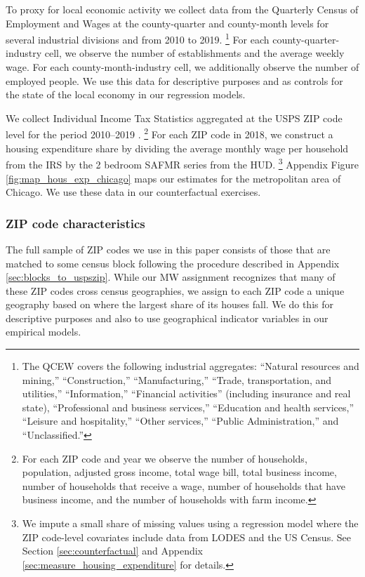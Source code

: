 To proxy for local economic activity we collect data from the 
Quarterly Census of Employment and Wages \parencite[QCEW;][]{QCEW} 
at the county-quarter and county-month levels for several industrial divisions 
and from 2010 to 2019.%
\footnote{The QCEW covers the following industrial aggregates: 
``Natural resources and mining,'' ``Construction,'' ``Manufacturing,'' 
``Trade, transportation, and utilities,'' ``Information,'' 
``Financial activities'' (including insurance and real state), 
``Professional and business services,'' ``Education and health services,'' 
``Leisure and hospitality,'' ``Other services,'' ``Public Administration,''
and ``Unclassified.''}
For each county-quarter-industry cell, we observe the number of establishments 
and the average weekly wage.
For each county-month-industry cell, we additionally observe the number of 
employed people.
We use this data for descriptive purposes and as controls for the state of 
the local economy in our regression models.

We collect Individual Income Tax Statistics aggregated at the USPS ZIP code 
level for the period 2010--2019 \parencite[][IRS for short]{IRS}.%
\footnote{For each ZIP code and year we observe the number of households, 
population, adjusted gross income, total wage bill, total business income, 
number of households that receive a wage, number of households that have 
business income, and the number of households with farm income.}
For each ZIP code in 2018, we construct a housing expenditure share by dividing 
the average monthly wage per household from the IRS by the 2 bedroom SAFMR 
series from the HUD.%
\footnote{We impute a small share of missing values using a regression model 
where the ZIP code-level covariates include data from LODES and the US Census.
See Section \ref{sec:counterfactual} and Appendix 
\ref{sec:measure_housing_expenditure} for details.}
Appendix Figure \ref{fig:map_hous_exp_chicago} maps our estimates for the 
metropolitan area of Chicago.
We use these data in our counterfactual exercises.

\subsubsection{ZIP code characteristics}
\label{sec:data_other_cross}

The full sample of ZIP codes we use in this paper consists of those that are 
matched to some census block following the procedure described in Appendix \ref{sec:blocks_to_uspszip}.
While our MW assignment recognizes that many of these ZIP codes cross census 
geographies, we assign to each ZIP code a unique geography based on where the 
largest share of its houses fall.
We do this for descriptive purposes and also to use geographical indicator 
variables in our empirical models.

